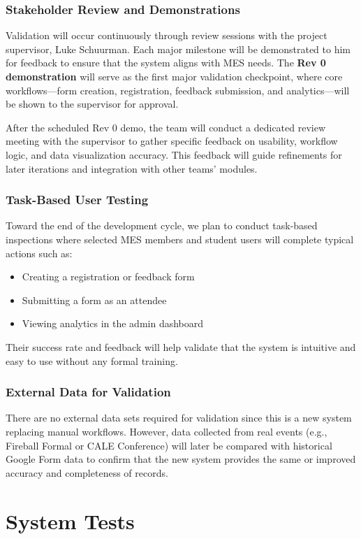 \documentclass[12pt, titlepage]{article}
\begin{document}
\subsubsection*{Stakeholder Review and Demonstrations}
Validation will occur continuously through review sessions with the project supervisor, Luke Schuurman. Each major milestone will be demonstrated to him for feedback to ensure that the system aligns with MES needs. The \textbf{Rev 0 demonstration} will serve as the first major validation checkpoint, where core workflows—form creation, registration, feedback submission, and analytics—will be shown to the supervisor for approval.

After the scheduled Rev 0 demo, the team will conduct a dedicated review meeting with the supervisor to gather specific feedback on usability, workflow logic, and data visualization accuracy. This feedback will guide refinements for later iterations and integration with other teams’ modules.

\subsubsection*{Task-Based User Testing}
Toward the end of the development cycle, we plan to conduct task-based inspections where selected MES members and student users will complete typical actions such as:
\begin{itemize}
  \item Creating a registration or feedback form
  \item Submitting a form as an attendee
  \item Viewing analytics in the admin dashboard
\end{itemize}
Their success rate and feedback will help validate that the system is intuitive and easy to use without any formal training.

\subsubsection*{External Data for Validation}
There are no external data sets required for validation since this is a new system replacing manual workflows. However, data collected from real events (e.g., Fireball Formal or CALE Conference) will later be compared with historical Google Form data to confirm that the new system provides the same or improved accuracy and completeness of records.

\section{System Tests}
\end{document}
